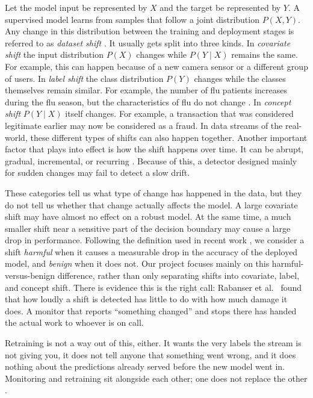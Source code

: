 \documentclass[graybox]{SNmult}
\begin{document}
Let the model input be represented by $X$ and the target be represented by $Y$. A supervised model learns from samples that follow a joint distribution $P(X, Y)$. 
Any change in this distribution between the training and deployment stages is referred to as \emph{dataset shift}
\cite{quinonero2009dataset}. It usually gets split into three kinds. In
\emph{covariate shift} the input distribution $P(X)$ changes while
$P(Y \mid X)$ remains the same. For example, this can happen because of a new camera sensor or a different group of users. In \emph{label shift} the class distribution $P(Y)$ changes while the classes themselves remain similar. For example, the number of flu patients increases during the flu season, but the characteristics of flu do not change \cite{lipton2018label}.
In \emph{concept shift} $P(Y \mid X)$ itself changes. For example, a transaction that was considered legitimate earlier may now be considered as a fraud. In data streams of the real-world, these different types of shifts can also happen together. Another important factor that plays into effect is how the shift happens over time. It can be abrupt, gradual, incremental, or recurring \cite{gama2014survey, lu2018learning}. Because of this, a detector designed mainly for sudden changes may fail to detect a slow drift.


These categories tell us what type of change has happened in the data, but they do not tell us whether that change actually affects the model. A large covariate shift may have almost no effect on a robust model. At the same time, a much smaller shift near a sensitive part of the decision boundary may cause a large drop in performance. Following the definition used in recent work \cite{amoukou2024sequential}, we consider a shift \emph{harmful} when it causes a measurable drop in the accuracy of the deployed model, and \emph{benign} when it does not. Our project focuses mainly on this harmful-versus-benign difference, rather than only separating shifts into covariate, label, and concept shift. There is evidence this is the right call: Rabanser et al.\
\cite{rabanser2019failing} found that how loudly a shift is detected has
little to do with how much damage it does. A monitor that reports
``something changed'' and stops there has handed the actual work to
whoever is on call.

Retraining is not a way out of this, either. It wants the very labels
the stream is not giving you, it does not tell anyone that something
went wrong, and it does nothing about the predictions already served
before the new model went in. Monitoring and retraining sit alongside
each other; one does not replace the other \cite{lu2018learning}.
\end{document}
